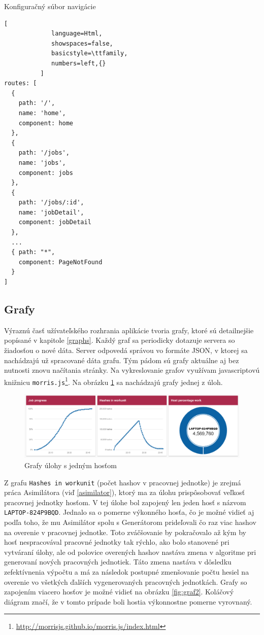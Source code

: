 \documentclass[slovak]{fitthesis}
\begin{document}
\begin{algorithm}[H]
  \caption{Konfiguračný súbor navigácie}
  \label{routerConfig}
  \begin{lstlisting}[
             language=Html,
             showspaces=false,
             basicstyle=\ttfamily,
             numbers=left,{}
          ]
routes: [
  {
    path: '/',
    name: 'home',
    component: home
  },
  {
    path: '/jobs',
    name: 'jobs',
    component: jobs
  },
  {
    path: '/jobs/:id',
    name: 'jobDetail',
    component: jobDetail
  },
  ...
  { path: "*",
    component: PageNotFound
  }
]
  \end{lstlisting}
\end{algorithm}


\subsection{Grafy}
Výraznú časť užívateľského rozhrania aplikácie tvoria grafy, ktoré sú detailnejšie popísané v kapitole \ref{graphs}. Každý graf sa periodicky dotazuje servera so žiadosťou o nové dáta. Server odpovedá správou vo formáte JSON, v ktorej sa nachádzajú už spracované dáta grafu. Tým pádom sú grafy aktuálne aj bez nutnosti znovu načítania stránky. Na vykreslovanie grafov využívam javascriptovú knižnicu \texttt{morris.js}\footnote{\url{http://morrisjs.github.io/morris.js/index.html}}. Na obrázku \ref{fig:graf1} sa nachádzajú grafy jednej z úloh.
\begin{figure}[H]
    \centering
    \includegraphics[scale=0.53]{obrazky/graf1.PNG}
    \caption{Grafy úlohy s jedným hosťom}
    \label{fig:graf1}
\end{figure} 
Z grafu \texttt{Hashes in workunit} (počet hashov v pracovnej jednotke) je zrejmá práca Asimilátora (viď \ref{asimilator}), ktorý ma za úlohu prispôsobovať veľkosť pracovnej jednotky hosťom. V tej úlohe bol zapojený len jeden hosť s názvom \texttt{LAPTOP-824P9BQD}. Jednalo sa o pomerne výkonného hosťa, čo je možné vidieť aj podľa toho, že mu Asimilátor spolu s Generátorom prideľovali čo raz viac hashov na overenie v pracovnej jednotke. Toto zváčšovanie by pokračovalo až kým by hosť nespracovával pracovné jednotky tak rýchlo, ako bolo stanovené pri vytváraní úlohy, ale od polovice overených hashov nastáva zmena v algoritme pri generovaní nových pracovných jednotiek. Táto zmena nastáva v dôsledku zefektívnenia výpočtu a má za následok postupné zmenšovanie počtu hesiel na overenie vo všetkých ďalších vygenerovaných pracovných jednotkách.  Grafy so zapojením viacero hosťov je možné vidieť na obrázku \ref{fig:graf2}. Koláčový diágram značí, že v tomto prípade boli hostia výkonnostne pomerne vyrovnaný. 
\end{document}
